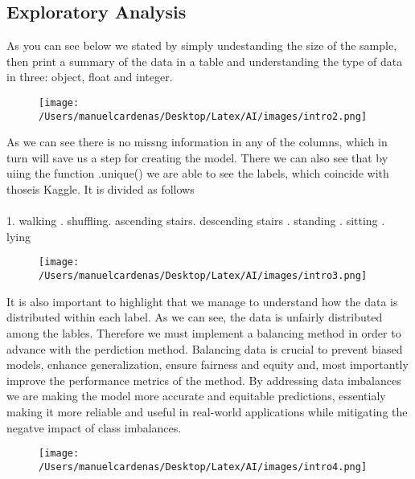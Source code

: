 \documentclass{article}
\begin{document}
    \subsection{Exploratory Analysis}

    As you can see below we stated by simply undestanding the size of the sample, then print a summary of the data 
    in a table and understanding the type of data in three: object, float and integer. \pagebreak
    \begin{figure}[h]
        \centering
        \texttt{[image: /Users/manuelcardenas/Desktop/Latex/AI/images/intro2.png]}
        \label{fig:intro2}
    \end{figure}




    As we can see there is no missng information in any of the columns, which in turn will save us a step for creating the model. 
    There we can also see that by uiing the function .unique() we are able to see the labels, which coincide with thoseis Kaggle. 
    It is divided as follows \\ \\
    1. walking . shuffling. ascending stairs. descending stairs . standing . sitting . lying \pagebreak
    \begin{figure}[h]
        \centering
        \texttt{[image: /Users/manuelcardenas/Desktop/Latex/AI/images/intro3.png]}
        \label{fig:intro3}
    \end{figure}






    It is also important to highlight that we manage to understand how the data is distributed within each label. 
    As we can see, the data is unfairly distributed among the lables. Therefore we must implement a balancing method in order 
    to advance with the perdiction method. Balancing data is crucial to prevent biased models, enhance generalization, ensure 
    fairness and equity and, most importantly improve the performance metrics of the method. By addressing data imbalances we are
    making the model more accurate and equitable predictions, essentialy making it more reliable and useful in real-world applications 
    while mitigating the negatve impact of class imbalances. \pagebreak
    \begin{figure}[h]
        \centering
        \texttt{[image: /Users/manuelcardenas/Desktop/Latex/AI/images/intro4.png]}
        \label{fig:intro4}
    \end{figure}
\end{document}
